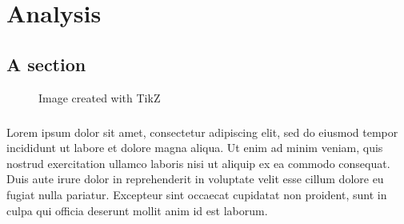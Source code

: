 
\chapter{Analysis}
\label{chp:analysis}

\section{A section}


\begin{figure}[ht]
    \centering
    
    \caption{Image created with TikZ} \label{fig:T1}
\end{figure}

\paragraph{}
Lorem ipsum dolor sit amet, consectetur adipiscing elit, sed do eiusmod tempor incididunt ut labore et dolore magna aliqua. Ut enim ad minim veniam, quis nostrud exercitation ullamco laboris nisi ut aliquip ex ea commodo consequat. Duis aute irure dolor in reprehenderit in voluptate velit esse cillum dolore eu fugiat nulla pariatur. Excepteur sint occaecat cupidatat non proident, sunt in culpa qui officia deserunt mollit anim id est laborum.

